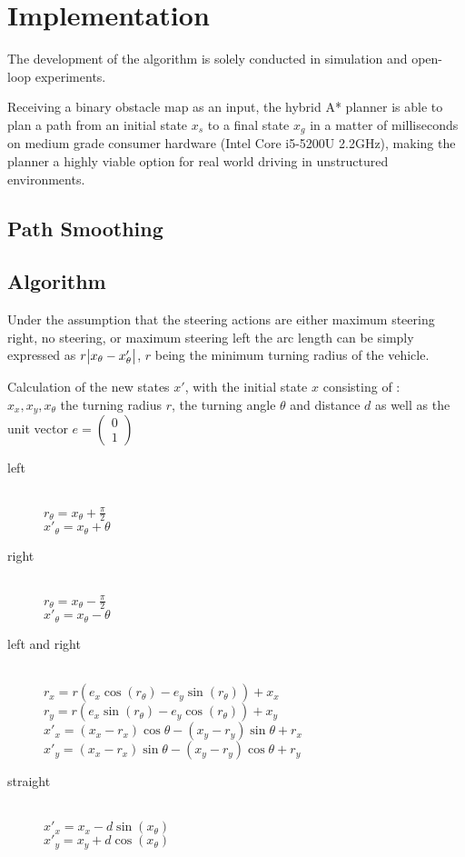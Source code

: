 \chapter{Implementation}
The development of the algorithm is solely conducted in simulation and open-loop experiments.

Receiving a binary obstacle map as an input, the hybrid A* planner is able to plan a path from an initial state $x_s$ to a final state $x_g$ in a matter of milliseconds on medium grade consumer hardware (Intel Core i5-5200U 2.2GHz), making the planner a highly viable option for real world driving in unstructured environments.


\section{Path Smoothing}

\section{Algorithm}

Under the assumption that the steering actions are either maximum steering right, no steering, or maximum steering left the arc length can be simply expressed as $r\abs{x_\theta- x'_\theta}$, $r$ being the minimum turning radius of the vehicle. 

Calculation of the new states $x'$, with the initial state $x$ consisting of :\\
$x_x, x_y, x_\theta$ the turning radius $r$, the turning angle $\theta$ and distance $d$ as well as the unit vector $e = \left(\begin{smallmatrix}0\\1\end{smallmatrix}\right)$
\begin{description}
  \item[left] \hfill \\
  $r_\theta = x_\theta + \frac{\pi}{2}$\\
  $x'_\theta = x_\theta + \theta$
  \item[right] \hfill \\
  $r_\theta = x_\theta - \frac{\pi}{2}$\\
  $x'_\theta = x_\theta - \theta$
  \item[left and right] \hfill\\
  $r_x = r(e_x\cos(r_\theta) - e_y\sin(r_\theta)) + x_x$\\
  $r_y = r(e_x\sin(r_\theta) - e_y\cos(r_\theta)) + x_y$\\
  $x'_x = (x_x-r_x)\cos\theta - (x_y-r_y)\sin\theta + r_x$\\
  $x'_y = (x_x-r_x)\sin\theta - (x_y-r_y)\cos\theta + r_y$
  \item[straight] \hfill \\
  $x'_x = x_x - d\sin(x_\theta)$\\
  $x'_y = x_y + d\cos(x_\theta)$
\end{description}